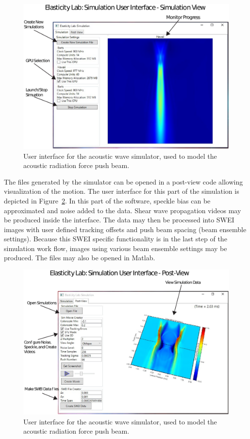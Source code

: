 \begin{figure}[htb!]
    \centering
    \includegraphics[width=0.75\linewidth]{steve/figs/image4.png}
    \caption{User interface for the acoustic wave simulator, used to model the
    acoustic radiation force push beam.} 
\label{fig:steve-UI}
\end{figure}

The files generated by the simulator can be opened in a post-view code allowing
visualization of the motion. The user interface for this part of the simulation
is depicted in Figure~\ref{fig:steve-post-UI}. In this part of the software, speckle
bias can be approximated and noise added to the data. Shear wave propagation
videos may be produced inside the interface. The data may then be processed
into SWEI images with user defined tracking offsets and push beam spacing
(beam ensemble settings). Because this SWEI specific functionality is in the
last step of the simulation work flow, images using various beam ensemble
settings may be produced. The files may also be opened in Matlab.

\begin{figure}[htb!]
    \centering
    \includegraphics[width=0.75\linewidth]{steve/figs/image5.png}
    \caption{User interface for the acoustic wave simulator, used to model the
    acoustic radiation force push beam.} 
\label{fig:steve-post-UI}
\end{figure}

